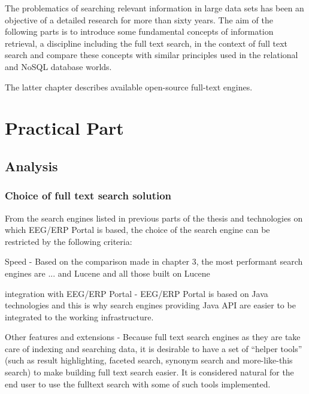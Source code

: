 \documentclass[12pt, oneside, a4paper]{book}
\begin{document}
The problematics of searching relevant information in large data sets has been an objective of a detailed research for more than sixty years. 
The aim of the following parts is to introduce some fundamental concepts
of information retrieval, a discipline including the full text search,
in the context of full text search and compare these concepts with similar principles used in the relational and
NoSQL database worlds.

The latter chapter describes available open-source full-text engines.












\part{Practical Part}


\chapter{Analysis}


\section{Choice of full text search solution}

From the search engines listed in previous parts of the thesis and technologies on which EEG/ERP Portal is based, the choice of the search engine can be restricted by the following criteria:

Speed - Based on the comparison made in chapter 3, the most performant search engines are ... and Lucene and all those built on Lucene

integration with EEG/ERP Portal - EEG/ERP Portal is based on Java technologies and this is why search engines providing Java API are easier to be integrated to the working infrastructure.

Other features and extensions - Because full text search
engines as they are take care of indexing and searching data, it is desirable to have a set of ``helper tools'' (such as result highlighting, faceted search, synonym search and more-like-this search) to make building full text search easier. It is considered natural for the end user to use the fulltext search with some of such tools implemented. 
\end{document}
